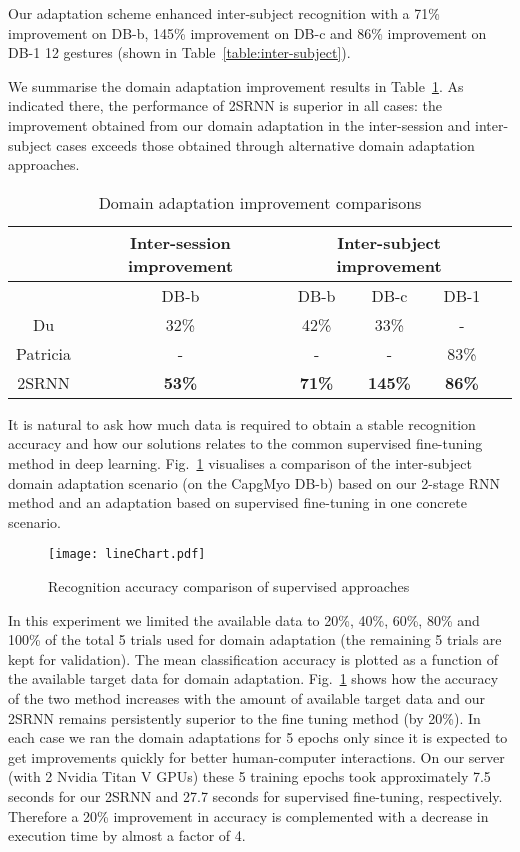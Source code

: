 \documentclass[conference]{IEEEtran}
\begin{document}
Our adaptation scheme enhanced inter-subject recognition with a 71\% improvement on DB-b, 145\% improvement on DB-c and 86\% improvement on DB-1 12 gestures (shown in Table~\ref{table:inter-subject}).

We summarise the domain adaptation improvement results in Table~\ref{table:speed-up}. As indicated there, the performance of 2SRNN is superior in all cases: the improvement obtained from our domain adaptation in the inter-session and inter-subject cases exceeds those obtained through alternative domain adaptation approaches.
\begin{table}[tpb]
	\centering
	\begin{threeparttable}
		\setlength{\tabcolsep}{2pt}
		\def\arraystretch{1.5}\begin{tabular}{|c|c|c|c|c|c|} 
			\hline
			& Inter-session improvement & \multicolumn{3}{|c|}{Inter-subject improvement} \\
			\hline
			& DB-b & DB-b & DB-c & DB-1 \\
			Du\cite{b18} & 32\% & 42\% & 33\% & - \\
			Patricia\cite{b7} & - & - & - & 83\% \\
			2SRNN & \textbf{53\%} & \textbf{71\%} & \textbf{145\%} & \textbf{86\%} \\
			\hline
		\end{tabular}
		\caption{Domain adaptation improvement comparisons}
		\label{table:speed-up}
	\end{threeparttable}
\end{table}

It is natural to ask how much data is required to obtain a stable recognition accuracy and how our solutions relates to the common supervised fine-tuning method in deep learning.
Fig.~\ref{figure:lineChart} visualises a comparison of the inter-subject domain adaptation scenario (on the CapgMyo DB-b) based on our 2-stage RNN method and an adaptation based on supervised fine-tuning in one concrete scenario.
\begin{figure}[tbp]
	\centerline{\texttt{[image: lineChart.pdf]}}
	\caption{Recognition accuracy comparison of supervised approaches}
	\label{figure:lineChart}
\end{figure}
In this experiment we limited the available data to 20\%, 40\%, 60\%, 80\% and 100\%
of the total 5 trials used for domain adaptation (the remaining 5 trials are kept for validation). The mean classification accuracy is plotted as a function of the available target data for domain adaptation. Fig.~\ref{figure:lineChart} shows how the accuracy of the two method
increases with the amount of available target data and our 2SRNN remains persistently superior to the fine tuning method (by 20\%).
In each case we ran the domain adaptations for 5 epochs only since it is expected to get improvements quickly for better human-computer interactions.
On our server (with 2 Nvidia Titan V GPUs) these 5 training epochs took approximately 7.5 seconds for our 2SRNN and 27.7 seconds for supervised fine-tuning, respectively. Therefore a 20\% improvement in accuracy is complemented with a decrease in execution time by almost a factor of 4.
\end{document}
